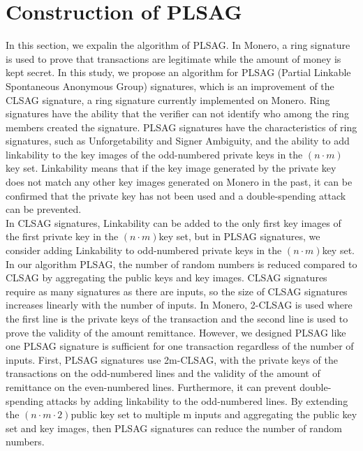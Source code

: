 \section{Construction of PLSAG}
    In this section, we expalin the algorithm of PLSAG.
    In Monero, a ring signature is used to prove that transactions are legitimate while the amount of money is kept secret. In this study, we propose an algorithm for PLSAG (Partial Linkable Spontaneous Anonymous Group) signatures, which is an improvement of the CLSAG signature, a ring signature currently implemented on Monero. Ring signatures have the ability that the verifier can not identify who among the ring members created the signature. PLSAG signatures have the characteristics of ring signatures, such as Unforgetability and Signer Ambiguity, and the ability to add linkability to the key images of the odd-numbered private keys in the $(n\cdot m)$key set. Linkability means that if the key image generated by the private key does not match any other key images generated on Monero in the past, it can be confirmed that the private key has not been used and a double-spending attack can be prevented.\\
    In CLSAG signatures, Linkability can be added to the only first key images of the first private key in the $(n\cdot m)$key set, but in PLSAG signatures, we consider adding Linkability to odd-numbered private keys in the $(n\cdot m)$key set. In our algorithm PLSAG, the number of random numbers is reduced compared to CLSAG by aggregating the public keys and key images. CLSAG signatures require as many signatures as there are inputs, so the size of CLSAG signatures increases linearly with the number of inputs. In Monero, 2-CLSAG is used where the first line is the private keys of the transaction and the second line is used to prove the validity of the amount remittance. However, we designed PLSAG like one PLSAG signature is sufficient for one transaction regardless of the number of inputs. First, PLSAG signatures use 2m-CLSAG, with the private keys of the transactions on the odd-numbered lines and the validity of the amount of remittance on the even-numbered lines. Furthermore, it can prevent double-spending attacks by adding linkability to the odd-numbered lines. By extending the $(n\cdot m \cdot 2)$public key set to multiple m inputs and aggregating the public key set and key images, then PLSAG signatures can reduce the number of random numbers.\\
    
